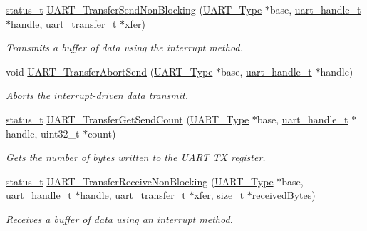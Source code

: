 \begin{DoxyCompactItemize}
\mbox{\hyperlink{group__ksdk__common_gaaabdaf7ee58ca7269bd4bf24efcde092}{status\+\_\+t}} \mbox{\hyperlink{group__uart__driver_gad89afd7db1656c5aef404bb285d0dc05}{U\+A\+R\+T\+\_\+\+Transfer\+Send\+Non\+Blocking}} (\mbox{\hyperlink{struct_u_a_r_t___type}{U\+A\+R\+T\+\_\+\+Type}} $\ast$base, \mbox{\hyperlink{struct__uart__handle}{uart\+\_\+handle\+\_\+t}} $\ast$handle, \mbox{\hyperlink{group__uart__driver_gae245db88e02822f416e4d246d49076df}{uart\+\_\+transfer\+\_\+t}} $\ast$xfer)
\begin{DoxyCompactList}\small\item\em Transmits a buffer of data using the interrupt method. \end{DoxyCompactList}\item 
void \mbox{\hyperlink{group__uart__driver_gaa64f9f89d8286fd3ef0736a8c40be2c2}{U\+A\+R\+T\+\_\+\+Transfer\+Abort\+Send}} (\mbox{\hyperlink{struct_u_a_r_t___type}{U\+A\+R\+T\+\_\+\+Type}} $\ast$base, \mbox{\hyperlink{struct__uart__handle}{uart\+\_\+handle\+\_\+t}} $\ast$handle)
\begin{DoxyCompactList}\small\item\em Aborts the interrupt-\/driven data transmit. \end{DoxyCompactList}\item 
\mbox{\hyperlink{group__ksdk__common_gaaabdaf7ee58ca7269bd4bf24efcde092}{status\+\_\+t}} \mbox{\hyperlink{group__uart__driver_ga071727ba05b2937ef5ad641ca7faf9c7}{U\+A\+R\+T\+\_\+\+Transfer\+Get\+Send\+Count}} (\mbox{\hyperlink{struct_u_a_r_t___type}{U\+A\+R\+T\+\_\+\+Type}} $\ast$base, \mbox{\hyperlink{struct__uart__handle}{uart\+\_\+handle\+\_\+t}} $\ast$handle, uint32\+\_\+t $\ast$count)
\begin{DoxyCompactList}\small\item\em Gets the number of bytes written to the U\+A\+RT TX register. \end{DoxyCompactList}\item 
\mbox{\hyperlink{group__ksdk__common_gaaabdaf7ee58ca7269bd4bf24efcde092}{status\+\_\+t}} \mbox{\hyperlink{group__uart__driver_gaf804acde5d73ce0a5bf54b06195e1218}{U\+A\+R\+T\+\_\+\+Transfer\+Receive\+Non\+Blocking}} (\mbox{\hyperlink{struct_u_a_r_t___type}{U\+A\+R\+T\+\_\+\+Type}} $\ast$base, \mbox{\hyperlink{struct__uart__handle}{uart\+\_\+handle\+\_\+t}} $\ast$handle, \mbox{\hyperlink{group__uart__driver_gae245db88e02822f416e4d246d49076df}{uart\+\_\+transfer\+\_\+t}} $\ast$xfer, size\+\_\+t $\ast$received\+Bytes)
\begin{DoxyCompactList}\small\item\em Receives a buffer of data using an interrupt method. \end{DoxyCompactList}\item 

\end{DoxyCompactItemize}
